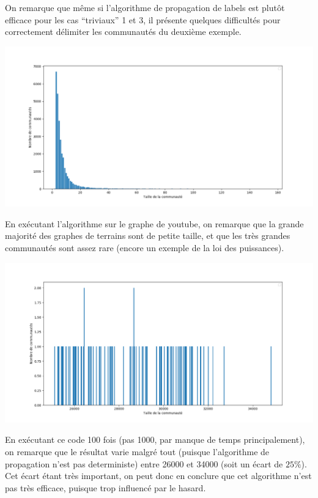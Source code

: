 \documentclass[a4paper]{report}
\begin{document}
On remarque que même si l'algorithme de propagation de labels est plutôt efficace pour les cas ``triviaux'' 1 et 3, il présente quelques difficultés pour correctement délimiter les communautés du deuxième exemple.

\begin{center}
  \includegraphics[width=0.6\paperwidth]{assets/histSizes.png}
\end{center}

En exécutant l'algorithme sur le graphe de youtube, on remarque que la grande majorité des graphes de terrains sont de petite taille, et que les très grandes communautés sont assez rare (encore un exemple de la loi des puissances).\\

\begin{center}
  \includegraphics[width=0.6\paperwidth]{assets/nbComs.png}
\end{center}

En exécutant ce code 100 fois (pas 1000, par manque de temps principalement), on remarque que le résultat varie malgré tout (puisque l'algorithme de propagation n'est pas deterministe) entre 26000 et 34000 (soit un écart de $25\%$). Cet écart étant très important, on peut donc en conclure que cet algorithme n'est pas très efficace, puisque trop influencé par le hasard.
\end{document}
